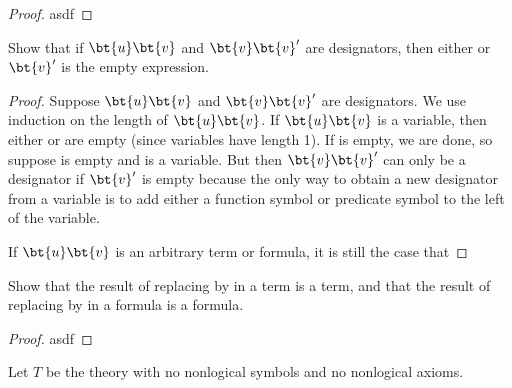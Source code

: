 
\begin{proof}
	asdf
\end{proof}


\begin{exercise}
	Show that if $\bt{u}\bt{v}$ and $\bt{v}\bt{v}'$ are 
	designators, then either  or $\bt{v}'$ is the empty 
	expression.
\end{exercise}


\begin{proof}
	Suppose $\bt{u}\bt{v}$ and $\bt{v}\bt{v}'$ are designators. We 
	use induction on the length of $\bt{u}\bt{v}$. If 
	$\bt{u}\bt{v}$ is a variable, then either  or  are 
	empty (since variables have length 1). If  is empty, we 
	are done, so suppose  is empty and  is a variable. 
	But then $\bt{v}\bt{v}'$ can only be a designator if $\bt{v}'$ 
	is empty because the only way to obtain a new designator from a 
	variable is to add either a function symbol or predicate symbol 
	to the left of the variable.
	
	If $\bt{u}\bt{v}$ is an arbitrary term or formula, it is still 
	the case that 
\end{proof}


\begin{exercise}
	Show that the result of replacing  by  in a term is 
	a term, and that the result of replacing  by  in a 
	formula is a formula.
\end{exercise}


\begin{proof}
	asdf
\end{proof}


\begin{exercise}
	Let $T$ be the theory with no nonlogical symbols and no 
	nonlogical axioms.
\end{exercise}





































